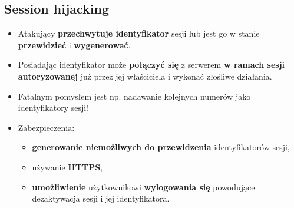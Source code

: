 \documentclass[../main.tex]{subfiles}
\begin{document}
    \subsection{Session hijacking}
    \begin{itemize}
        \item Atakujący \textbf{przechwytuje identyfikator} sesji lub jest go w stanie \textbf{przewidzieć} i
        \textbf{wygenerować}.
        \item Posiadając identyfikator może \textbf{połączyć się} z serwerem \textbf{w ramach sesji
        autoryzowanej} już przez jej właściciela i wykonać złośliwe działania.
        \item Fatalnym pomysłem jest np. nadawanie kolejnych numerów jako identyfikatory sesji!
        \item Zabezpieczenia:
        \begin{itemize}
            \item \textbf{generowanie niemożliwych do przewidzenia} identyfikatorów sesji,
            \item używanie \textbf{HTTPS},
            \item \textbf{umożliwienie} użytkownikowi \textbf{wylogowania się} powodujące dezaktywacja sesji
            i jej identyfikatora.
        \end{itemize}
    \end{itemize}
\end{document}
